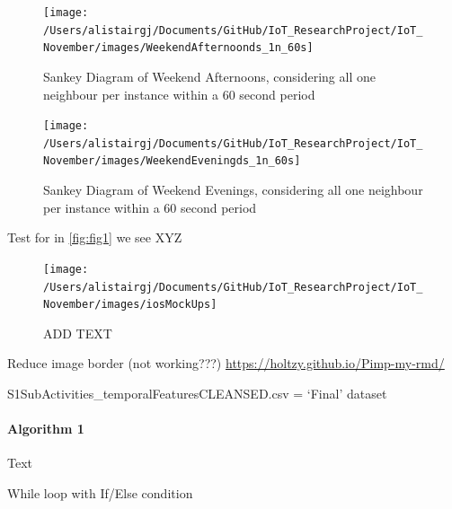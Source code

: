 \documentclass[11pt,]{article}
\let\oldparagraph\paragraph
\renewcommand{\paragraph}[1]{\oldparagraph{#1}\mbox{}}
\begin{document}
\begin{figure}[H]

{\centering \texttt{[image: /Users/alistairgj/Documents/GitHub/IoT\_ResearchProject/IoT\_November/images/WeekendAfternoonds\_1n\_60s]} 

}

\caption{Sankey Diagram of Weekend Afternoons, considering all one neighbour per instance within a 60 second period}\label{fig:sankey_WeekendAfternoonds_1n_60s}
\end{figure}

\begin{figure}[H]

{\centering \texttt{[image: /Users/alistairgj/Documents/GitHub/IoT\_ResearchProject/IoT\_November/images/WeekendEveningds\_1n\_60s]} 

}

\caption{Sankey Diagram of Weekend Evenings, considering all one neighbour per instance within a 60 second period}\label{fig:sankey_WeekendEveningds_1n_60s}
\end{figure}

\pagebreak

Test for in \ref{fig:fig1} we see XYZ

\begin{figure}[H]

{\centering \texttt{[image: /Users/alistairgj/Documents/GitHub/IoT\_ResearchProject/IoT\_November/images/iosMockUps]} 

}

\caption{ADD TEXT}\label{fig:unnamed-chunk-12}
\end{figure}

\pagebreak

Reduce image border (not working???)
\url{https://holtzy.github.io/Pimp-my-rmd/}

S1SubActivities\_temporalFeaturesCLEANSED.csv = `Final' dataset

\hypertarget{algorithm-1}{%
\paragraph{Algorithm 1}\label{algorithm-1}}

Text

\begin{algorithm}[H]
\DontPrintSemicolon
\SetAlgoLined
{}
\BlankLine
{}
\caption{While loop with If/Else condition}
\end{algorithm}
\end{document}
